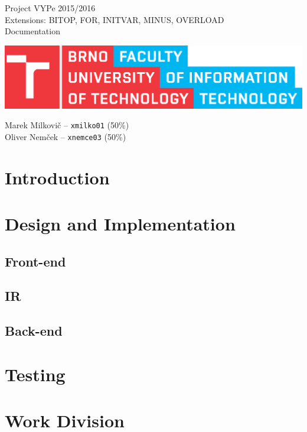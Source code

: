 \documentclass[12pt]{article}
\begin{document}
\nocite{*}
\begin{titlepage}
	\begin{center}
		\noindent\LARGE{Project VYPe 2015/2016} \\
		\scriptsize{Extensions: BITOP, FOR, INITVAR, MINUS, OVERLOAD} \\
		\Large{Documentation}
	\end{center}
	\vfill
	\begin{center}
		\includegraphics[scale=0.7]{FIT_logo.eps}
	\end{center}
	\vfill
	Marek Milkovič -- \texttt{xmilko01} (50\%) \\
	Oliver Nemček -- \texttt{xnemce03} (50\%)
\end{titlepage}
\thispagestyle{empty}
\tableofcontents
\clearpage

\setcounter{page}{1}
\section{Introduction}
\section{Design and Implementation}
\subsection{Front-end}
\subsection{IR}
\subsection{Back-end}
\section{Testing}
\section{Work Division}

\clearpage

\begin{flushleft}
	
\end{flushleft}
\end{document}
